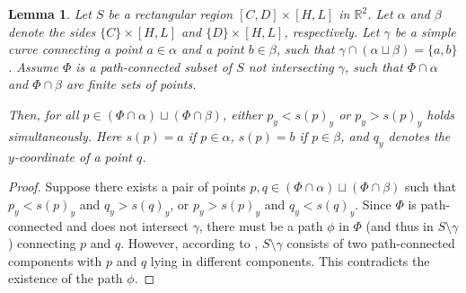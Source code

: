 \documentclass[a4paper,12pt,reqno,oneside]{amsart}
\theoremstyle{plain}
\newtheorem{lemma}{Lemma}
\theoremstyle{definition}
\theoremstyle{plain}
\begin{document}
\begin{lemma}\label{lemma:square}
  Let $S$ be a rectangular region $[C, D] \times [H, L]$ in $\mathbb{R}^2$. Let $\alpha$ and $\beta$ denote the sides
  $\{C\} \times [H, L]$ and $\{D\} \times [H, L]$, respectively. Let $\gamma$ be a simple curve
  connecting a point $a \in \alpha$ and a point $b \in \beta$, such that
  $\gamma \cap (\alpha \sqcup \beta) = \{a, b\}$. Assume $\Phi$ is a path-connected subset of $S$
  not intersecting $\gamma$, such that $\Phi \cap \alpha$ and $\Phi \cap \beta$ are finite sets of
  points.

  Then, for all $p \in (\Phi \cap \alpha) \sqcup (\Phi \cap \beta)$, either $p_y < s(p)_y$ or
  $p_y > s(p)_y$ holds simultaneously. Here $s(p) = a$ if $p \in \alpha$, $s(p) = b$ if $p \in \beta$, and
  $q_y$ denotes the $y$-coordinate of a point $q$.
\end{lemma}
\begin{proof}
  Suppose there exists a pair of points
  $p, q \in (\Phi \cap \alpha) \sqcup (\Phi \cap \beta)$ such that $p_y < s(p)_y$ and
  $q_y > s(q)_y$, or $p_y > s(p)_y$ and $q_y < s(q)_y$. Since $\Phi$ is path-connected and does not
  intersect $\gamma$, there must be a path $\phi$ in $\Phi$ (and thus in $S \setminus \gamma$)
  connecting $p$ and $q$. However, according to \cite[Theorem 8, Chapter 2]{moise},
  $S \setminus \gamma$ consists of two path-connected components with $p$ and $q$ lying in different
  components. This contradicts the existence of the path $\phi$.
\end{proof}
\end{document}
